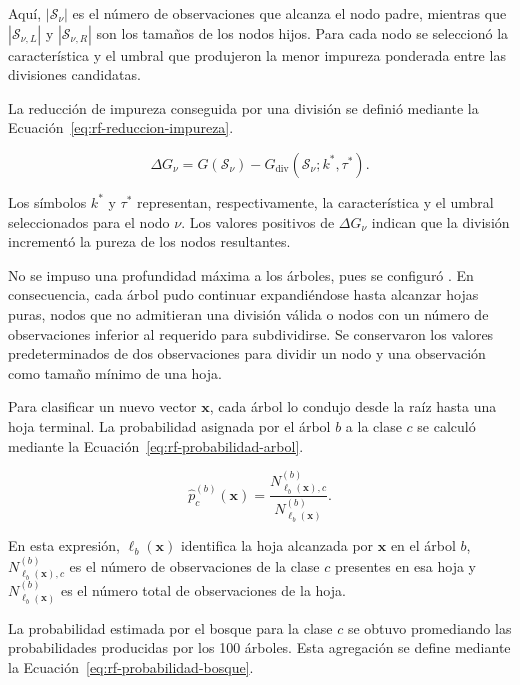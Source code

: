 Aquí, $|\mathcal S_\nu|$ es el número de observaciones que alcanza el nodo padre, mientras que $|\mathcal S_{\nu,L}|$ y $|\mathcal S_{\nu,R}|$ son los tamaños de los nodos hijos. Para cada nodo se seleccionó la característica y el umbral que produjeron la menor impureza ponderada entre las divisiones candidatas.

La reducción de impureza conseguida por una división se definió mediante la Ecuación~\eqref{eq:rf-reduccion-impureza}.

\begin{equation}
\Delta G_\nu
=
G(\mathcal S_\nu)
-
G_{\mathrm{div}}
\left(
\mathcal S_\nu;k^\ast,\tau^\ast
\right).
\label{eq:rf-reduccion-impureza}
\end{equation}

Los símbolos $k^\ast$ y $\tau^\ast$ representan, respectivamente, la característica y el umbral seleccionados para el nodo $\nu$. Los valores positivos de $\Delta G_\nu$ indican que la división incrementó la pureza de los nodos resultantes.

No se impuso una profundidad máxima a los árboles, pues se configuró \protect{}. En consecuencia, cada árbol pudo continuar expandiéndose hasta alcanzar hojas puras, nodos que no admitieran una división válida o nodos con un número de observaciones inferior al requerido para subdividirse. Se conservaron los valores predeterminados de dos observaciones para dividir un nodo y una observación como tamaño mínimo de una hoja.

Para clasificar un nuevo vector $\mathbf x$, cada árbol lo condujo desde la raíz hasta una hoja terminal. La probabilidad asignada por el árbol $b$ a la clase $c$ se calculó mediante la Ecuación~\eqref{eq:rf-probabilidad-arbol}.

\begin{equation}
\widehat p_c^{(b)}(\mathbf x)
=
\frac{
N_{\ell_b(\mathbf x),c}^{(b)}
}{
N_{\ell_b(\mathbf x)}^{(b)}
}.
\label{eq:rf-probabilidad-arbol}
\end{equation}

En esta expresión, $\ell_b(\mathbf x)$ identifica la hoja alcanzada por $\mathbf x$ en el árbol $b$, $N_{\ell_b(\mathbf x),c}^{(b)}$ es el número de observaciones de la clase $c$ presentes en esa hoja y $N_{\ell_b(\mathbf x)}^{(b)}$ es el número total de observaciones de la hoja.

La probabilidad estimada por el bosque para la clase $c$ se obtuvo promediando las probabilidades producidas por los 100 árboles. Esta agregación se define mediante la Ecuación~\eqref{eq:rf-probabilidad-bosque}.

